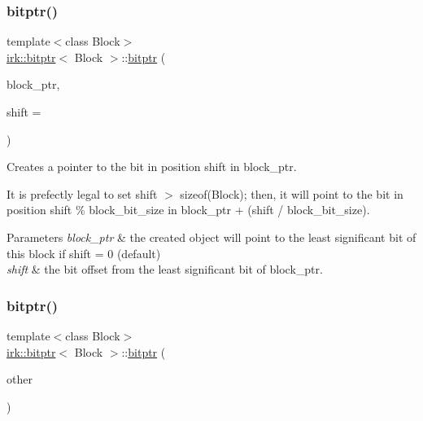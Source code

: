 \subsubsection{\texorpdfstring{bitptr()}{bitptr()}\hspace{0.1cm}{\footnotesize\ttfamily [1/2]}}
{\footnotesize\ttfamily template$<$class Block$>$ \\
\mbox{\hyperlink{classirk_1_1bitptr}{irk\+::bitptr}}$<$ Block $>$\+::\mbox{\hyperlink{classirk_1_1bitptr}{bitptr}} (\begin{DoxyParamCaption}\item[{Block $\ast$}]{block\+\_\+ptr,  }\item[{std\+::uint8\+\_\+t}]{shift = {} }\end{DoxyParamCaption})\hspace{0.3cm}{\ttfamily [inline]}}



Creates a pointer to the bit in position {\ttfamily shift} in {\ttfamily block\+\_\+ptr}. 

It is prefectly legal to set {\ttfamily shift $>$ sizeof(\+Block)}; then, it will point to the bit in position {\ttfamily shift \% block\+\_\+bit\+\_\+size} in {\ttfamily block\+\_\+ptr + (shift / block\+\_\+bit\+\_\+size)}.


\begin{DoxyParams}{Parameters}
{\em block\+\_\+ptr} & the created object will point to the least significant bit of this block if {\ttfamily shift = 0} (default) \\
\hline
{\em shift} & the bit offset from the least significant bit of {\ttfamily block\+\_\+ptr}. \\
\hline
\end{DoxyParams}
\mbox{\label{classirk_1_1bitptr_aa1c908a8d26c9286270ccb73ca5a3d85}} 
\subsubsection{\texorpdfstring{bitptr()}{bitptr()}\hspace{0.1cm}{\footnotesize\ttfamily [2/2]}}
{\footnotesize\ttfamily template$<$class Block$>$ \\
\mbox{\hyperlink{classirk_1_1bitptr}{irk\+::bitptr}}$<$ Block $>$\+::\mbox{\hyperlink{classirk_1_1bitptr}{bitptr}} (\begin{DoxyParamCaption}\item[{const \mbox{\hyperlink{classirk_1_1bitptr}{bitptr}}$<$ Block $>$ \&}]{other }\end{DoxyParamCaption})\hspace{0.3cm}{\ttfamily [inline]}}



